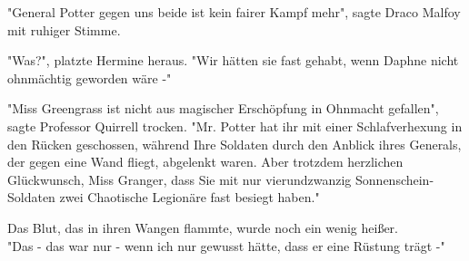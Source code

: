 {"General Potter gegen uns beide ist kein fairer Kampf mehr", sagte Draco Malfoy mit ruhiger Stimme.

"Was?", platzte Hermine heraus. "Wir hätten sie fast gehabt, wenn Daphne nicht ohnmächtig geworden wäre -"

"Miss Greengrass ist nicht aus magischer Erschöpfung in Ohnmacht gefallen", sagte Professor Quirrell trocken. "Mr. Potter hat ihr mit einer Schlafverhexung in den Rücken geschossen, während Ihre Soldaten durch den Anblick ihres Generals, der gegen eine Wand fliegt, abgelenkt waren. Aber trotzdem herzlichen Glückwunsch, Miss Granger, dass Sie mit nur vierundzwanzig Sonnenschein-Soldaten zwei Chaotische Legionäre fast besiegt haben."

Das Blut, das in ihren Wangen flammte, wurde noch ein wenig heißer.\\ "Das - das war nur - wenn ich nur gewusst hätte, dass er eine Rüstung trägt -"

}

